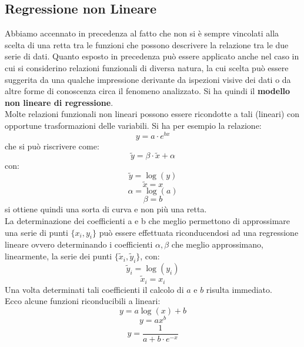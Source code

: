 \documentclass[a4paper,12pt, oneside]{book}
\begin{document}
\subsection{Regressione non Lineare}
Abbiamo accennato in precedenza al fatto che non si è sempre vincolati alla scelta di una retta tra le funzioni che possono descrivere la relazione tra le due
serie di dati. Quanto esposto in precedenza può essere applicato anche nel caso in cui si
considerino relazioni funzionali di diversa natura, la cui scelta può essere suggerita da una qualche impressione derivante da ispezioni visive dei dati o da
altre forme di conoscenza circa il fenomeno analizzato. Si ha quindi il \textbf{modello non lineare di regressione}.\\
Molte relazioni funzionali non lineari possono essere ricondotte a tali (lineari) con opportune trasformazioni delle variabili. Si ha per esempio la relazione:
$$y=a\cdot e^{bx}$$
che si può riscrivere come:
$$\widetilde{y}=\beta\cdot \widetilde{x}+\alpha$$
con: 
$$\widetilde{y}=\log(y)$$
$$\widetilde{x}=x$$
$$\alpha=\log(a)$$
$$\beta=b$$
si ottiene quindi una sorta di curva e non più una retta.\\
La determinazione dei coefficienti a e b che meglio permettono di approssimare una
serie di punti $\{x_i,y_i\}$ può essere effettuata riconducendosi ad una regressione lineare ovvero determinando
i coefficienti $\alpha,\beta$ che meglio approssimano, linearmente, la serie dei punti $\{\widetilde{x}_i,\widetilde{y}_i\}$, con:
$$\widetilde{y}_i=\log(y_i)$$
$$\widetilde{x}_i=x_i$$
Una volta determinati tali coefficienti il calcolo di $a$ e $b$ risulta immediato. \\
Ecco alcune funzioni riconducibili a lineari:
$$y=a\log(x)+b$$
$$y=ax^b$$
$$y=\frac{1}{a+b\cdot e^{-x}}$$
\end{document}

